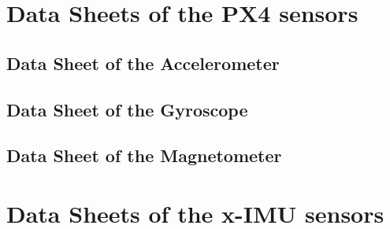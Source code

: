 \chapter{Data Sheets of the PX4 sensors}\label{ds}
\section{Data Sheet of the Accelerometer}\label{ds_acc}

\section{Data Sheet of the Gyroscope}\label{ds_gyro}

\section{Data Sheet of the Magnetometer}\label{ds_mag}

\chapter{Data Sheets of the x-IMU sensors}\label{ds_ximu}



